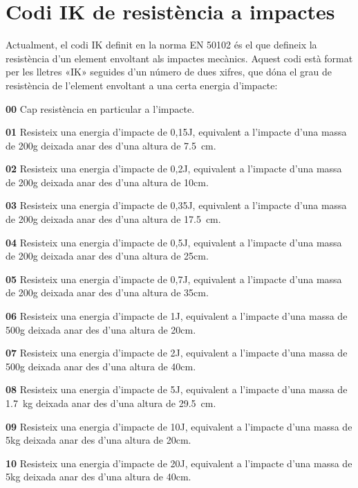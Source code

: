 \section{Codi IK de resistència a impactes}   

Actualment, el codi IK definit en la norma EN 50102 és el que defineix la resistència d'un element  envoltant als impactes mecànics. Aquest codi està format per les lletres «IK» seguides d'un número de dues xifres, que dóna el grau de resistència de l'element envoltant a una certa energia d'impacte:

\begin{list}{}
   {\setlength{\labelwidth}{10mm} \setlength{\leftmargin}{10mm} \setlength{\labelsep}{2mm}}
   \item[\textbf{00}] Cap resistència en particular a l'impacte.
   \item[\textbf{01}] Resisteix una energia d'impacte de 0,15\unit{J}, equivalent a l'impacte d'una massa de 200\unit{g} deixada anar des d'una altura de \SI{7,5}{cm}.
   \item[\textbf{02}] Resisteix una energia d'impacte de 0,2\unit{J}, equivalent a l'impacte d'una massa de 200\unit{g} deixada anar des d'una altura de 10\unit{cm}.
   \item[\textbf{03}] Resisteix una energia d'impacte de 0,35\unit{J}, equivalent a l'impacte d'una massa de 200\unit{g} deixada anar des d'una altura de \SI{17,5}{cm}.
   \item[\textbf{04}] Resisteix una energia d'impacte de 0,5\unit{J}, equivalent a l'impacte d'una massa de 200\unit{g} deixada anar des d'una altura de 25\unit{cm}.
   \item[\textbf{05}] Resisteix una energia d'impacte de 0,7\unit{J}, equivalent a l'impacte d'una massa de 200\unit{g} deixada anar des d'una altura de 35\unit{cm}.
   \item[\textbf{06}]Resisteix una energia d'impacte de 1\unit{J}, equivalent a l'impacte d'una massa de 500\unit{g} deixada anar des d'una altura de 20\unit{cm}.
   \item[\textbf{07}]Resisteix una energia d'impacte de 2\unit{J}, equivalent a l'impacte d'una massa de 500\unit{g} deixada anar des d'una altura de 40\unit{cm}.
   \item[\textbf{08}]Resisteix una energia d'impacte de 5\unit{J}, equivalent a l'impacte d'una massa de \SI{1,7}{kg} deixada anar des d'una altura de \SI{29,5}{cm}.
   \item[\textbf{09}]Resisteix una energia d'impacte de 10\unit{J}, equivalent a l'impacte d'una massa de 5\unit{kg} deixada anar des d'una altura de 20\unit{cm}.
   \item[\textbf{10}]Resisteix una energia d'impacte de 20\unit{J}, equivalent a l'impacte d'una massa de 5\unit{kg} deixada anar des d'una altura de 40\unit{cm}.
\end{list}



